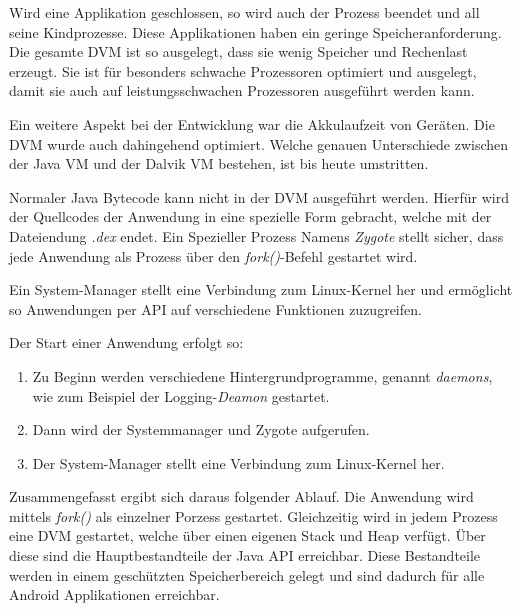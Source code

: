 Wird eine Applikation geschlossen, so wird auch der Prozess beendet und all seine Kindprozesse. Diese Applikationen haben ein geringe Speicheranforderung. Die gesamte DVM ist so ausgelegt, dass sie wenig Speicher und Rechenlast erzeugt. Sie ist für besonders schwache Prozessoren optimiert und ausgelegt, damit sie auch auf leistungsschwachen Prozessoren ausgeführt werden kann.

Ein weitere Aspekt bei der Entwicklung war die Akkulaufzeit von Geräten. Die DVM wurde auch dahingehend optimiert. Welche genauen Unterschiede zwischen der Java VM und der Dalvik VM bestehen, ist bis heute umstritten\cite{news_2}.

Normaler Java Bytecode kann nicht in der DVM ausgeführt werden. Hierfür wird der Quellcodes der Anwendung in eine spezielle Form gebracht, welche mit der Dateiendung \textit{.dex} endet. Ein Spezieller Prozess Namens \textit{Zygote} stellt sicher, dass jede Anwendung als Prozess über den \textit{fork()}-Befehl gestartet wird.

Ein System-Manager stellt eine Verbindung zum Linux-Kernel her und ermöglicht so Anwendungen per API auf verschiedene Funktionen zuzugreifen.

Der Start einer Anwendung erfolgt so:

\begin{enumerate}
   \item Zu Beginn werden verschiedene Hintergrundprogramme, genannt \textit{daemons}, wie zum Beispiel der Logging-\textit{Deamon} gestartet.
   \item Dann wird der Systemmanager und Zygote aufgerufen.
   \item Der System-Manager stellt eine Verbindung zum Linux-Kernel her.
\end{enumerate}
 
 Zusammengefasst ergibt sich daraus folgender Ablauf. Die Anwendung wird mittels \textit{fork()} als einzelner Porzess gestartet. Gleichzeitig wird in jedem Prozess eine DVM gestartet, welche über einen eigenen Stack und Heap verfügt. Über diese sind die Hauptbestandteile der Java API erreichbar. Diese Bestandteile werden in einem geschützten Speicherbereich gelegt und sind dadurch für alle Android Applikationen erreichbar.
 
